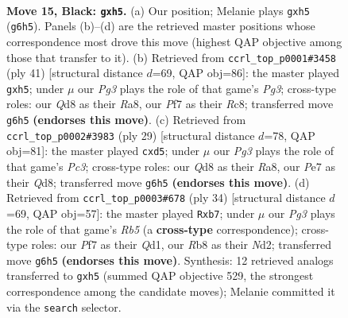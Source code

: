 \documentclass[11pt]{article}
\begin{document}
\clearpage

\begin{figure}[p]\centering
\begin{subfigure}{0.46\textwidth}\centering
\resizebox{\linewidth}{!}{%
\newchessgame
\chessboard[
  setfen={1rbq1rk1/p2pppbp/2p3p1/7P/P1P1BP2/2N3P1/1P6/R1BQ1RK1 b - - 0 15},
  showmover=false,
  pgfstyle=straightmove, color=movearrow, markmove={g6-h5}
]}
\caption{}
\end{subfigure}\hfill
\begin{subfigure}{0.46\textwidth}\centering
\resizebox{\linewidth}{!}{%
\newchessgame
\chessboard[
  setfen={r1r3k1/3n1pbp/b3p1p1/q2pP2P/Pp1Q4/1B2BN2/1P3PP1/R3R1K1 b - - 4 21},
  showmover=false,
  pgfstyle=straightmove, color=movearrow, markmove={g6-h5}
]}
\caption{}
\end{subfigure}
\\[4pt]
\begin{subfigure}{0.46\textwidth}\centering
\resizebox{\linewidth}{!}{%
\newchessgame
\chessboard[
  setfen={r2q1rk1/pp1bppbp/2p3p1/3P4/4P2P/Q3BP2/PP2BP2/3RK2R b K - 1 15},
  showmover=false,
  pgfstyle=straightmove, color=movearrow, markmove={c6-d5}
]}
\caption{}
\end{subfigure}\hfill
\begin{subfigure}{0.46\textwidth}\centering
\resizebox{\linewidth}{!}{%
\newchessgame
\chessboard[
  setfen={r3r1k1/bppq1pp1/2n4p/PR2pb2/8/3P2P1/3NPPBP/2BQ1RK1 w - - 1 18},
  showmover=false,
  pgfstyle=straightmove, color=movearrow, markmove={b5-b7}
]}
\caption{}
\end{subfigure}
\caption{\textbf{Move 15, Black: \texttt{gxh5}.} (a) Our position; Melanie plays \texttt{gxh5} (\texttt{g6h5}). Panels (b)--(d) are the retrieved master positions whose correspondence most drove this move (highest QAP objective among those that transfer to it). (b) Retrieved from \texttt{ccrl\_top\_p0001\#3458} (ply 41) [structural distance $d$=69, QAP obj=86]: the master played \texttt{gxh5}; under $\mu$ our \emph{Pg3} plays the role of that game's \emph{Pg3}; cross-type roles: our \emph{Q}d8 as their \emph{R}a8, our \emph{P}f7 as their \emph{R}c8; transferred move \texttt{g6h5} \textbf{(endorses this move)}. (c) Retrieved from \texttt{ccrl\_top\_p0002\#3983} (ply 29) [structural distance $d$=78, QAP obj=81]: the master played \texttt{cxd5}; under $\mu$ our \emph{Pg3} plays the role of that game's \emph{Pc3}; cross-type roles: our \emph{Q}d8 as their \emph{R}a8, our \emph{P}e7 as their \emph{Q}d8; transferred move \texttt{g6h5} \textbf{(endorses this move)}. (d) Retrieved from \texttt{ccrl\_top\_p0003\#678} (ply 34) [structural distance $d$=69, QAP obj=57]: the master played \texttt{Rxb7}; under $\mu$ our \emph{Pg3} plays the role of that game's \emph{Rb5} (a \textbf{cross-type} correspondence); cross-type roles: our \emph{P}f7 as their \emph{Q}d1, our \emph{R}b8 as their \emph{N}d2; transferred move \texttt{g6h5} \textbf{(endorses this move)}. Synthesis: 12 retrieved analogs transferred to \texttt{gxh5} (summed QAP objective 529, the strongest correspondence among the candidate moves); Melanie committed it via the \texttt{search} selector.}
\label{fig:thought-m29}
\end{figure}
\end{document}
